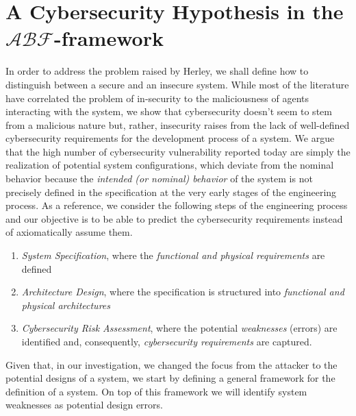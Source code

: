 \documentclass[conference]{IEEEtran}
\newcommand{\assertionRegion}{\mathcal{A}}
\newcommand{\beliefRegion}{\mathcal{B}}
\newcommand{\factRegion}{\mathcal{F}}
\newcommand{\abftheory}{\assertionRegion\beliefRegion\factRegion}
\begin{document}
\section{A Cybersecurity Hypothesis in the $\abftheory$-framework}\label{sec:hypothesis}
In order to address the problem raised by Herley, we shall define how to
distinguish between a secure and an insecure system. While most of the
literature have correlated the problem of in-security
to the maliciousness of agents interacting with the system, we show that
cybersecurity doesn't seem to stem from a malicious nature but, rather, insecurity
raises from the lack of well-defined cybersecurity requirements for the development
process of a system. We argue that the high number of cybersecurity vulnerability
reported today are simply the realization of potential system configurations,
which deviate from the nominal behavior because the \emph{intended (or
nominal) behavior} of the system is not precisely defined in the specification
at the very early stages of the engineering process.
As a reference, we consider the following steps of the engineering process
and our objective is to be able to predict the cybersecurity requirements
instead of axiomatically assume them.
\begin{enumerate}
	\item \emph{System Specification}, where the \emph{functional and physical requirements} are defined
	\item \emph{Architecture Design}, where the specification is structured into \emph{functional and physical architectures}
	\item \emph{Cybersecurity Risk Assessment}, where the potential \emph{weaknesses} (errors)
		are identified and, consequently, \emph{cybersecurity requirements} are
		captured.
\end{enumerate}
Given that, in our investigation, we changed the focus from the attacker to the
potential designs of a system, we start by defining a general framework for the definition
of a system. On top of this framework we will identify system weaknesses as potential
design errors.
\end{document}
